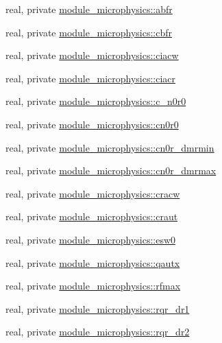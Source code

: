 \begin{DoxyCompactItemize}
\item 
real, private \hyperlink{namespacemodule__microphysics_a8f4f8d798ec89d8bb550fa6b6f8eda06}{module\+\_\+microphysics\+::abfr}
\item 
real, private \hyperlink{namespacemodule__microphysics_afdcb4cd9370ca50745e65221becb6eae}{module\+\_\+microphysics\+::cbfr}
\item 
real, private \hyperlink{namespacemodule__microphysics_a9e41f7e6287fe7ede81f17b9e041c09e}{module\+\_\+microphysics\+::ciacw}
\item 
real, private \hyperlink{namespacemodule__microphysics_a1c6192a9baafa2b341b19628e00c19b5}{module\+\_\+microphysics\+::ciacr}
\item 
real, private \hyperlink{namespacemodule__microphysics_ac36c8de45d04aab21833d22133311284}{module\+\_\+microphysics\+::c\+\_\+n0r0}
\item 
real, private \hyperlink{namespacemodule__microphysics_a4b8b65e65be09b3e9a5cceca947fc408}{module\+\_\+microphysics\+::cn0r0}
\item 
real, private \hyperlink{namespacemodule__microphysics_abd42b2566e31b5d29c6f69471cb3ec5d}{module\+\_\+microphysics\+::cn0r\+\_\+dmrmin}
\item 
real, private \hyperlink{namespacemodule__microphysics_a3757ff5b4210247ec04e08537dfa9696}{module\+\_\+microphysics\+::cn0r\+\_\+dmrmax}
\item 
real, private \hyperlink{namespacemodule__microphysics_ac2d7886b9a3b896fbfdce0e3bf3b805a}{module\+\_\+microphysics\+::cracw}
\item 
real, private \hyperlink{namespacemodule__microphysics_aa70387aeb638af57989b45128bfe387d}{module\+\_\+microphysics\+::craut}
\item 
real, private \hyperlink{namespacemodule__microphysics_a74a1e9686afb4c7b7b7913cf9615ee0c}{module\+\_\+microphysics\+::esw0}
\item 
real, private \hyperlink{namespacemodule__microphysics_a207d110ab05ae003282c44232b6bb8b1}{module\+\_\+microphysics\+::qautx}
\item 
real, private \hyperlink{namespacemodule__microphysics_a733f21868223ca01612507355d0b85be}{module\+\_\+microphysics\+::rfmax}
\item 
real, private \hyperlink{namespacemodule__microphysics_ada6772b0bc7347f6ebb3c31f2df43563}{module\+\_\+microphysics\+::rqr\+\_\+dr1}
\item 
real, private \hyperlink{namespacemodule__microphysics_ab0d5f615986c3482d2fad8542c4f52b8}{module\+\_\+microphysics\+::rqr\+\_\+dr2}

\end{DoxyCompactItemize}
